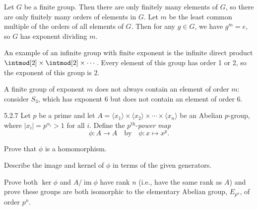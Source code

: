\begin{sol}
    Let $G$ be a finite group.
	Then there are only finitely many elements of $G$, so there are only finitely many orders of elements in $G$.
	Let $m$ be the least common multiple of the orders of all elements of $G$.
	Then for any $g \in G$, we have $g^m = e$, so $G$ has exponent dividing $m$.
    
    An example of an infinite group with finite exponent is the infinite direct product $\intmod[2] \times \intmod[2] \times \cdots$.
	Every element of this group has order 1 or 2, so the exponent of this group is 2.
    
    A finite group of exponent $m$ does not always contain an element of order $m$: consider $S_3$, which has exponent 6 but does not contain an element of order 6.
\end{sol}

\begin{exercise}{5.2.7}
    Let $p$ be a prime and let $A = \langle x_1 \rangle \times \langle x_2 \rangle \times \cdots \times \langle x_n \rangle$ be an Abelian $p$-group, where $|x_i| = p^{\alpha_i} > 1$ for all $i$.
	Define the $p^{\text{th}}$-\emph{power map}
    \[
    	\phi : A \to A \quad \text{by} \quad \phi : x \mapsto x^p.
    \]
    \begin{subexercises}
        \item Prove that $\phi$ is a homomorphism.
        \item Describe the image and kernel of $\phi$ in terms of the given generators.
        \item Prove both $\ker \phi$ and $A / \operatorname{im} \phi$ have rank $n$ (i.e., have the same rank as $A$) and prove these groups are both isomorphic to the elementary Abelian group, $E_{p^n}$, of order $p^n$.
    \end{subexercises}
\end{exercise}

